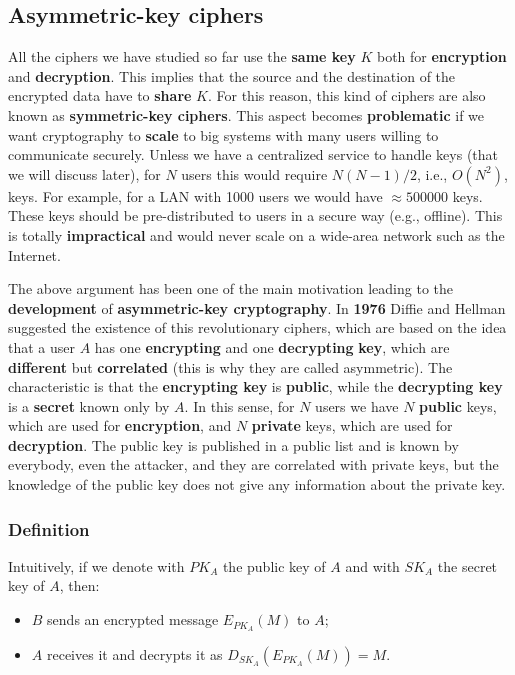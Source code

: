 
\subsection{Asymmetric-key ciphers}
All the ciphers we have studied so far use the \textbf{same key} $K$ both for \textbf{encryption} and \textbf{decryption}. This implies that the source and the destination of the encrypted data have to \textbf{share} $K$. For this reason, this kind of ciphers are also known as \textbf{symmetric-key ciphers}. This aspect becomes \textbf{problematic} if we want cryptography to \textbf{scale} to big systems with many users willing to communicate securely. Unless we have a centralized service to handle keys (that we will discuss later), for $N$ users this would require $N(N-1)/2$, i.e., $O(N^2)$, keys. For example, for a LAN with 1000 users we would have $\approx 500000$ keys. These keys should be pre-distributed to users in a secure way (e.g., offline). This is totally \textbf{impractical} and would never scale on a wide-area network such as the Internet.

The above argument has been one of the main motivation leading to the \textbf{development} of \textbf{asymmetric-key cryptography}. In \textbf{1976} Diffie and Hellman suggested the existence of this revolutionary ciphers, which are based on the idea that a user $A$ has one \textbf{encrypting} and one \textbf{decrypting} \textbf{key}, which are \textbf{different} but \textbf{correlated} (this is why they are called asymmetric). The characteristic is that the \textbf{encrypting key} is \textbf{public}, while the \textbf{decrypting key} is a \textbf{secret} known only by $A$. In this sense, for $N$ users we have $N$ \textbf{public} keys, which are used for \textbf{encryption}, and $N$ \textbf{private} keys, which are used for \textbf{decryption}. The public key is published in a public list and is known by everybody, even the attacker, and they are correlated with private keys, but the knowledge of the public key does not give any information about the private key.

\subsubsection{Definition}
Intuitively, if we denote with $PK_A$ the public key of $A$ and with $SK_A$ the secret key of $A$, then:

\begin{itemize}
    \item $B$ sends an encrypted message $E_{PK_A}(M)$ to $A$;
    \item $A$ receives it and decrypts it as $D_{SK_A}(E_{PK_A}(M))=M$.
\end{itemize}


